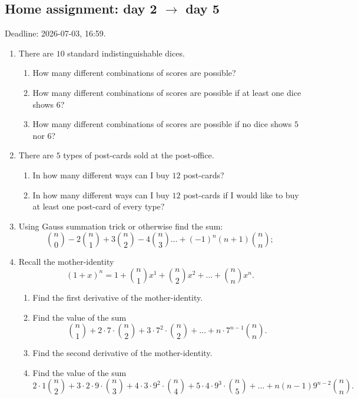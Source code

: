 \documentclass[12pt]{article}
\begin{document}





\subsection*{Home assignment: day 2 $\to$ day 5}

Deadline: 2026-07-03, 16:59. 

\begin{enumerate}
    \item There are $10$ standard indistinguishable dices. 

\begin{enumerate}[label=\alph*)]
    \item How many different combinations of scores are possible?
    \item How many different combinations of scores are possible if at least one dice shows $6$?
    \item How many different combinations of scores are possible if no dice shows $5$ nor $6$?
\end{enumerate}

\item There are $5$ types of post-cards sold at the post-office. 
\begin{enumerate}[label=\alph*)]
\item In how many different ways can I buy $12$ post-cards?
\item In how many different ways can I buy $12$ post-cards if I would like to buy at least one post-card of every type?
\end{enumerate}

\item Using Gauss summation trick or otherwise find the sum:
\[
{n \choose 0} - 2 {n \choose 1} + 3 {n \choose 2} - 4 {n \choose 3} \dots + (-1)^n (n+1){n \choose n};
\]

\item Recall the mother-identity
\[
(1 + x)^n = 1 + {n \choose 1} x^1 + {n \choose 2} x^2 + \dots + {n \choose n} x^n.
\]

\begin{enumerate}
    \item Find the first derivative of the mother-identity. 
    \item Find the value of the sum
\[
{n \choose 1} + 2 \cdot 7 \cdot {n \choose 2} + 3 \cdot 7^2 \cdot {n \choose 2} + \dots + n \cdot 7^{n-1} {n \choose n}.
\]
\item Find the second derivative of the mother-identity.
\item Find the value of the sum
\[
2 \cdot 1 {n \choose 2} + 3 \cdot 2 \cdot 9 \cdot {n \choose 3} + 4 \cdot 3 \cdot 9^2 \cdot {n \choose 4} + 5 \cdot 4 \cdot 9^3 \cdot {n \choose 5} + \dots + n(n-1) 9^{n-2} {n \choose n}.
\]

\end{enumerate}

\end{enumerate}
\end{document}
